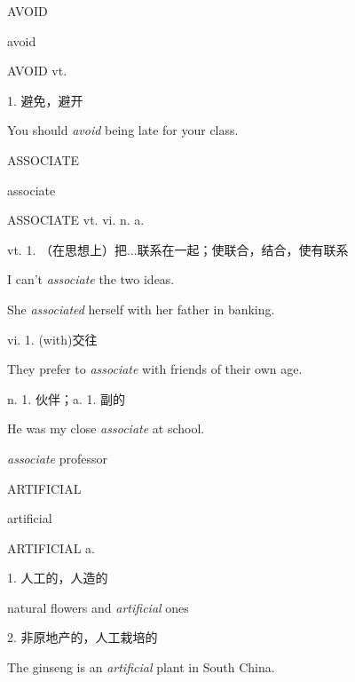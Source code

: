 \begin{flashcard}{
AVOID

avoid
}
\begin{center}
AVOID vt. 
\end{center}
1. 避免，避开

You should \textit{avoid} being late for your class.

\end{flashcard}
\begin{flashcard}{
ASSOCIATE

associate
}
\begin{center}
ASSOCIATE vt. vi.  n. a. 
\end{center}
vt. 1. （在思想上）把...联系在一起；使联合，结合，使有联系

I can't \textit{associate} the two ideas.

She \textit{associated} herself with her father in banking.

vi. 1. (with)交往

They prefer to \textit{associate} with friends of their own age.

n. 1. 伙伴；a. 1. 副的

He was my close \textit{associate} at school.

\textit{associate} professor

\end{flashcard}
\begin{flashcard}{
ARTIFICIAL

artificial
}
\begin{center}
ARTIFICIAL a. 
\end{center}
1. 人工的，人造的

natural flowers and \textit{artificial} ones

2. 非原地产的，人工栽培的

The ginseng is an \textit{artificial} plant in South China.

\end{flashcard}
